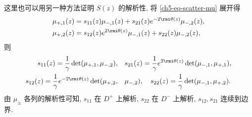 \begin{remark}
    这里也可以用另一种方法证明 $S(z)$ 的解析性, 将 \eqref{ch5-eq-scatter-mu} 展开得
    \begin{align}
        \mu_{+,1}(z) & = s_{11}(z) \mu_{-,1}(z) + s_{21}(z) e^{-2 \rmi \theta(z)} \mu_{-,2}(z),
        \label{ch5-eq-scatter-mu1}                                                              \\
        \mu_{+,2}(z) & = s_{12}(z) e^{2 \rmi \theta(z)} \mu_{-,1}(z) + s_{22}(z) \mu_{-,2}(z),
        \label{ch5-eq-scatter-mu2}
    \end{align}
    则
    \begin{align}
        s_{11}(z) = \frac{1}{\gamma}\det(\mu_{+,1}, \mu_{-,2}), \quad            & s_{21}(z) = \frac{1}{\gamma} e^{2 \rmi \theta(z)} \det(\mu_{-,1}, \mu_{+,1}), \label{ch5-eq-scatter-s11-s21}
        \\
        s_{12}(z) = \frac{1}{\gamma} e^{-2 \rmi \theta(z)} \det(\mu_{+,2}, \quad & \mu_{-,2}), \quad s_{22}(z) = \frac{1}{\gamma}\det(\mu_{-,1}, \mu_{+,2}). \label{ch5-eq-scatter-s12-s22}
    \end{align}
    由 $ \mu_{\pm} $ 各列的解析性可知, $ s_{11}$ 在 $D^{+}$ 上解析, $s_{22}$ 在 $D^{-}$ 上解析, $s_{12}, s_{21}$ 连续到边界.
\end{remark}
